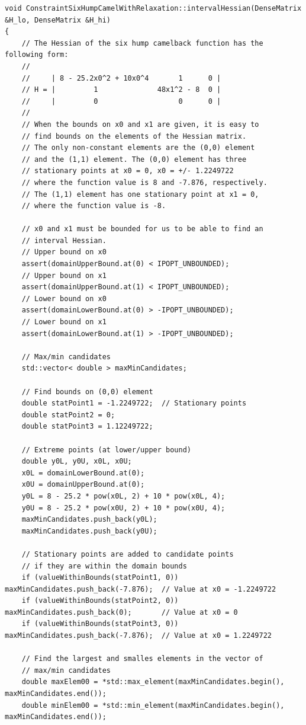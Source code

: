 \begin{lstlisting}
void ConstraintSixHumpCamelWithRelaxation::intervalHessian(DenseMatrix &H_lo, DenseMatrix &H_hi)
{
	// The Hessian of the six hump camelback function has the following form:
	//
	//     | 8 - 25.2x0^2 + 10x0^4       1      0 |
	// H = |         1              48x1^2 - 8  0 |
	//     |         0                   0      0 |
	//
	// When the bounds on x0 and x1 are given, it is easy to
	// find bounds on the elements of the Hessian matrix.
	// The only non-constant elements are the (0,0) element
	// and the (1,1) element. The (0,0) element has three 
	// stationary points at x0 = 0, x0 = +/- 1.2249722
	// where the function value is 8 and -7.876, respectively.
	// The (1,1) element has one stationary point at x1 = 0,
	// where the function value is -8.

	// x0 and x1 must be bounded for us to be able to find an
	// interval Hessian.
	// Upper bound on x0
	assert(domainUpperBound.at(0) < IPOPT_UNBOUNDED);
	// Upper bound on x1   
	assert(domainUpperBound.at(1) < IPOPT_UNBOUNDED);  
	// Lower bound on x0 
	assert(domainLowerBound.at(0) > -IPOPT_UNBOUNDED);  
	// Lower bound on x1
	assert(domainLowerBound.at(1) > -IPOPT_UNBOUNDED);  

	// Max/min candidates
	std::vector< double > maxMinCandidates;

	// Find bounds on (0,0) element
	double statPoint1 = -1.2249722;  // Stationary points
	double statPoint2 = 0;
	double statPoint3 = 1.12249722;

	// Extreme points (at lower/upper bound)
	double y0L, y0U, x0L, x0U;
	x0L = domainLowerBound.at(0);
	x0U = domainUpperBound.at(0);
	y0L = 8 - 25.2 * pow(x0L, 2) + 10 * pow(x0L, 4);
	y0U = 8 - 25.2 * pow(x0U, 2) + 10 * pow(x0U, 4);
	maxMinCandidates.push_back(y0L);
	maxMinCandidates.push_back(y0U);

	// Stationary points are added to candidate points
	// if they are within the domain bounds
	if (valueWithinBounds(statPoint1, 0)) maxMinCandidates.push_back(-7.876);  // Value at x0 = -1.2249722
	if (valueWithinBounds(statPoint2, 0)) maxMinCandidates.push_back(0);       // Value at x0 = 0
	if (valueWithinBounds(statPoint3, 0)) maxMinCandidates.push_back(-7.876);  // Value at x0 = 1.2249722
	
	// Find the largest and smalles elements in the vector of
	// max/min candidates
	double maxElem00 = *std::max_element(maxMinCandidates.begin(), maxMinCandidates.end());
	double minElem00 = *std::min_element(maxMinCandidates.begin(), maxMinCandidates.end());


\end{lstlisting}
